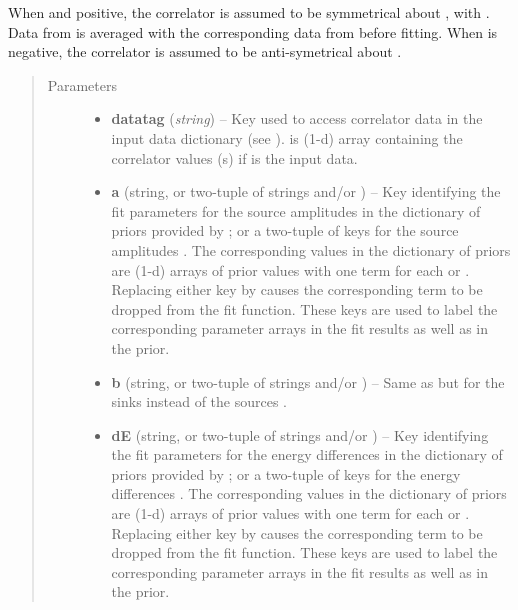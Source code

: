\documentclass[letterpaper,10pt,english]{sphinxmanual}
\begin{document}
\begin{fulllineitems}
When  and positive, the correlator is assumed to be
symmetrical about , with . Data from
 is averaged with the corresponding data from 
before fitting. When  is negative, the correlator is assumed to
be anti-symetrical about .
\begin{quote}\begin{description}
\item[{Parameters}] \leavevmode\begin{itemize}
\item {} 
\textbf{datatag} (\emph{string}) -- Key used to access correlator data in the input data 
dictionary (see {\hyperref[corrfitter:corrfitter.CorrFitter]{}}).  is (1-d) 
array containing the correlator values (s) if  is the 
input data.

\item {} 
\textbf{a} (string, or two-tuple of strings and/or ) -- Key identifying the fit parameters for the source amplitudes
 in the dictionary of priors provided by {\hyperref[corrfitter:corrfitter.CorrFitter]{}}; or a
two-tuple of keys for the source amplitudes . The
corresponding values in the dictionary of priors are (1-d) arrays
of prior values with one term for each  or .
Replacing either key by  causes the corresponding term to
be dropped from the fit function. These keys are used to label the
corresponding parameter arrays in the fit results as well as in the
prior.

\item {} 
\textbf{b} (string, or two-tuple of strings and/or ) -- Same as  but for the sinks  instead of
the sources .

\item {} 
\textbf{dE} (string, or two-tuple of strings and/or ) -- Key identifying the fit parameters for the energy 
differences  in the dictionary of priors provided by
{\hyperref[corrfitter:corrfitter.CorrFitter]{}}; or a two-tuple of keys for the energy differences
. The corresponding values in the dictionary of priors
are (1-d) arrays of prior values with one term for each 
or . Replacing either key by  causes the
corresponding term to be dropped from the fit function. These keys
are used to label the corresponding parameter arrays in the fit
results as well as in the prior.


\end{itemize}
\end{description}
\end{quote}
\end{fulllineitems}
\end{document}
